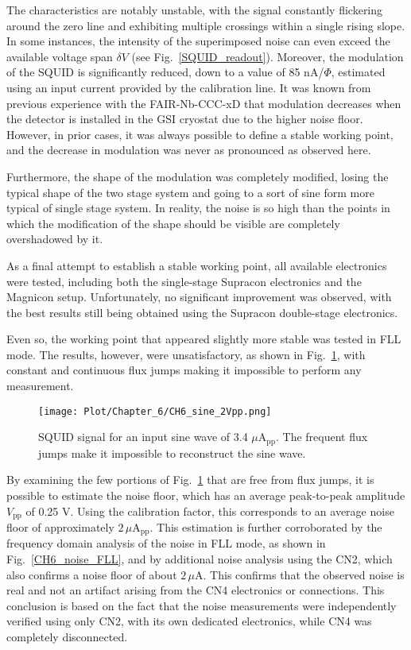 \documentclass[12pt,a4paper]{report}
\begin{document}
	The characteristics are notably unstable, with the signal constantly flickering around the zero line and exhibiting multiple crossings within a single rising slope. In some instances, the intensity of the superimposed noise can even exceed the available voltage span $\delta V$ (see Fig.~\ref{SQUID_readout}). Moreover, the modulation of the SQUID is significantly reduced, down to a value of 85 nA/$\Phi$, estimated using an input current provided by the calibration line. It was known from previous experience with the FAIR-Nb-CCC-xD that modulation decreases when the detector is installed in the GSI cryostat due to the higher noise floor. However, in prior cases, it was always possible to define a stable working point, and the decrease in modulation was never as pronounced as observed here.
	
	Furthermore, the shape of the modulation was completely modified, losing the typical shape of the two stage system and going to a sort of sine form more typical of single stage system. In reality, the noise is so high than the points in which the modification of the shape should be visible are completely overshadowed by it.
	
	As a final attempt to establish a stable working point, all available electronics were tested, including both the single-stage Supracon electronics and the Magnicon setup. Unfortunately, no significant improvement was observed, with the best results still being obtained using the Supracon double-stage electronics.
	
	Even so, the working point that appeared slightly more stable was tested in FLL mode. The results, however, were unsatisfactory, as shown in Fig.~\ref{CH6_FLL}, with constant and continuous flux jumps making it impossible to perform any measurement.
	
	\begin{figure}[H]
		\centering
		\texttt{[image: Plot/Chapter\_6/CH6\_sine\_2Vpp.png]}
		\caption{\small{SQUID signal for an input sine wave of 3.4 $\mu$A$_{\text{pp}}$. The frequent flux jumps make it impossible to reconstruct the sine wave.}}
		\label{CH6_FLL} 
	\end{figure}
	
	By examining the few portions of Fig.~\ref{CH6_FLL} that are free from flux jumps, it is possible to estimate the noise floor, which has an average peak-to-peak amplitude $V_{\text{pp}}$ of 0.25 V. Using the calibration factor, this corresponds to an average noise floor of approximately $2 \, \mu$A$_{\text{pp}}$. This estimation is further corroborated by the frequency domain analysis of the noise in FLL mode, as shown in Fig.~\ref{CH6_noise_FLL}, and by additional noise analysis using the CN2, which also confirms a noise floor of about $2 \, \mu$A. This confirms that the observed noise is real and not an artifact arising from the CN4 electronics or connections. This conclusion is based on the fact that the noise measurements were independently verified using only CN2, with its own dedicated electronics, while CN4 was completely disconnected.
	
\end{document}
